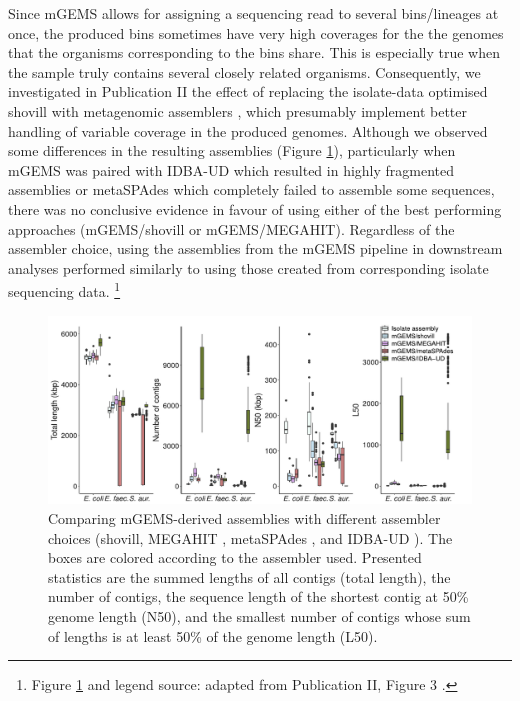 \documentclass[officiallayout]{tktla}
\let\svthefootnote\thefootnote
\begin{document}
Since mGEMS allows for assigning a sequencing read to several
bins/lineages at once, the produced bins sometimes have very high
coverages for the the genomes that the organisms corresponding to the
bins share. This is especially true when the sample truly contains
several closely related organisms. Consequently, we investigated in
Publication II the effect of replacing the isolate-data optimised
shovill with metagenomic assemblers \citep{peng2012idba,
  li2015megahit, nurk2017metaspades}, which presumably implement
better handling of variable coverage in the produced genomes. Although
we observed some differences in the resulting assemblies (Figure
\ref{fig:mgems-assembler-choice-statistics}), particularly when mGEMS
was paired with IDBA-UD which resulted in highly fragmented assemblies
or metaSPAdes which completely failed to assemble some sequences,
there was no conclusive evidence in favour of using either of the best
performing approaches (mGEMS/shovill or mGEMS/MEGAHIT). Regardless of
the assembler choice, using the assemblies from the mGEMS pipeline in
downstream analyses performed similarly to using those created from
corresponding isolate sequencing data.
\noindent\let\thefootnote\relax\footnote{Figure \ref{fig:mgems-assembler-choice-statistics} and legend source: adapted from Publication II, Figure 3 \citep{maklin_bacterial_2021}.}
\addtocounter{footnote}{-1}\let\thefootnote\svthefootnote
\begin{figure}[!t]
    \centering
    \includegraphics[width=\textwidth,keepaspectratio]{img/reproduced/MGen2021_mGEMS_Figure_3d.pdf}
    \caption{Comparing mGEMS-derived assemblies with different
      assembler choices (shovill, MEGAHIT \citep{li2015megahit},
      metaSPAdes \citep{nurk2017metaspades}, and IDBA-UD
      \citep{peng2012idba}). The boxes are colored according to the
      assembler used. Presented statistics are the summed lengths
      of all contigs (total length), the number of contigs, the
      sequence length of the shortest contig at 50\% genome length
      (N50), and the smallest number of contigs whose sum of lengths
      is at least 50\% of the genome length (L50).}
    \label{fig:mgems-assembler-choice-statistics}
\end{figure}
\end{document}

